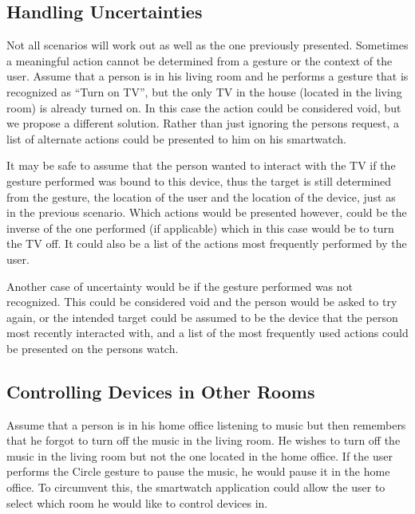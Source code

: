 \subsection{Handling Uncertainties}
\label{sec:analysis:scenarios:handling_uncertainties}

Not all scenarios will work out as well as the one previously presented.
Sometimes a meaningful action cannot be determined from a gesture or the context of the user.
Assume that a person is in his living room and he performs a gesture that is recognized as ``Turn on TV'', but the only TV in the house (located in the living room) is already turned on.
In this case the action could be considered void, but we propose a different solution.
Rather than just ignoring the persons request, a list of alternate actions could be presented to him on his smartwatch.

It may be safe to assume that the person wanted to interact with the TV if the gesture performed was bound to this device, thus the target is still determined from the gesture, the location of the user and the location of the device, just as in the previous scenario.
Which actions would be presented however, could be the inverse of the one performed (if applicable) which in this case would be to turn the TV off.
It could also be a list of the actions most frequently performed by the user.

Another case of uncertainty would be if the gesture performed was not recognized.
This could be considered void and the person would be asked to try again, or the intended target could be assumed to be the device that the person most recently interacted with, and a list of the most frequently used actions could be presented on the persons watch.

\subsection{Controlling Devices in Other Rooms}
\label{sec:analysis:scenarios:other_rooms}

Assume that a person is in his home office listening to music but then remembers that he forgot to turn off the music in the living room.
He wishes to turn off the music in the living room but not the one located in the home office.
If the user performs the Circle gesture to pause the music, he would pause it in the home office.
To circumvent this, the smartwatch application could allow the user to select which room he would like to control devices in.

